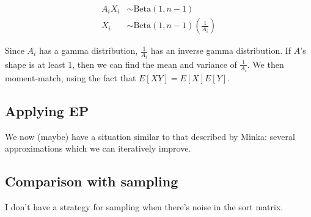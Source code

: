 \documentclass{article}\usepackage[]{graphicx}\usepackage[]{color}
\begin{document}
\begin{align*}
A_i X_i &\sim \mathrm{Beta}(1, n-1) \\
X_i &\sim {\mathrm{Beta}(1, n-1)}(\frac{1}{A_i})
\end{align*}


Since $A_i$ has a gamma distribution, $\frac{1}{A_i}$ has
an inverse gamma distribution. If $A$'s shape is at least
1, then we can find the mean and variance of $\frac{1}{A_i}$.
We then moment-match, using the fact that $E[XY] = E[X]E[Y]$.


\subsection{Applying EP}

We now (maybe) have a situation similar to that
described by Minka: several approximations which we can
iteratively improve.





\subsection{Comparison with sampling}


I don't have a strategy for sampling when there's noise
in the sort matrix.
\end{document}

